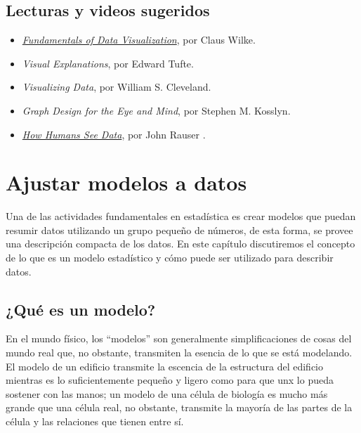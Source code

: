 \documentclass[
  12pt,
]{book}
\providecommand{\tightlist}{%
  \setlength{\itemsep}{0pt}\setlength{\parskip}{0pt}}
\begin{document}
\hypertarget{lecturas-y-videos-sugeridos}{%
\section{Lecturas y videos sugeridos}\label{lecturas-y-videos-sugeridos}}

\begin{itemize}
\tightlist
\item
  \href{https://serialmentor.com/dataviz/}{\emph{Fundamentals of Data Visualization}}, por Claus Wilke.
\item
  \emph{Visual Explanations}, por Edward Tufte.
\item
  \emph{Visualizing Data}, por William S. Cleveland.
\item
  \emph{Graph Design for the Eye and Mind}, por Stephen M. Kosslyn.
\item
  \href{https://www.youtube.com/watch?v=fSgEeI2Xpdc\&feature=youtu.be}{\emph{How Humans See Data}}, por John Rauser .
\end{itemize}

\hypertarget{fitting-models}{%
\chapter{Ajustar modelos a datos}\label{fitting-models}}

Una de las actividades fundamentales en estadística es crear modelos que puedan resumir datos utilizando un grupo pequeño de números, de esta forma, se provee una descripción compacta de los datos. En este capítulo discutiremos el concepto de lo que es un modelo estadístico y cómo puede ser utilizado para describir datos.

\hypertarget{quuxe9-es-un-modelo}{%
\section{¿Qué es un modelo?}\label{quuxe9-es-un-modelo}}

En el mundo físico, los ``modelos'' son generalmente simplificaciones de cosas del mundo real que, no obstante, transmiten la esencia de lo que se está modelando. El modelo de un edificio transmite la escencia de la estructura del edificio mientras es lo suficientemente pequeño y ligero como para que unx lo pueda sostener con las manos; un modelo de una célula de biología es mucho más grande que una célula real, no obstante, transmite la mayoría de las partes de la célula y las relaciones que tienen entre sí.
\end{document}
